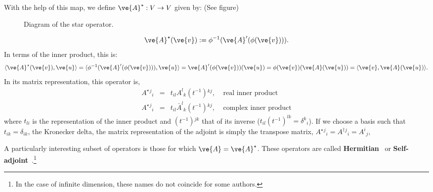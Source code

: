 {%
%
With the help of this map, we define $\ve{A}^{\star}: V \to V$ given by:
(See figure)




\espa 


\begin{figure}[htbp]
  \begin{center}
    \caption{Diagram of the star operator.}
    \label{fig:2_3}
  \end{center}
\end{figure}

\begin{equation}
  \label{eq:A_adjunto}
  \ve{A}^{\star}(\ve{v}) := \phi^{-1}(\ve{A}'(\phi(\ve{v}))).
\end{equation}
%
In terms of the inner product, this is:
\begin{equation}
  \label{eq:A_adjunto_2}
  \langle \ve{A}^{\star}(\ve{v}),\ve{u} \rangle = \langle \phi^{-1}(\ve{A}'(\phi(\ve{v}))),\ve{u} \rangle
                                               = \ve{A}'(\phi(\ve{v}))(\ve{u}) 
                                               = \phi(\ve{v})(\ve{A}(\ve{u}))
                                               = \langle \ve{v},\ve{A}(\ve{u}) \rangle.
\end{equation}
%
In its matrix representation, this operator is, 
\begin{eqnarray}
A^{\star}{}^j{}_i &=& t_{il} A^l{}_k (t^{-1}){}^{kj} , \;\;\;\; \mbox{real inner product} \\
A^{\star}{}^j{}_i &=& t_{il} \bar{A}^l{}_k (t^{-1}){}^{kj} , \;\;\;\; \mbox{complex inner product} 
\end{eqnarray}
%
where $t_{li}$ is the representation of the inner product and $(t^{-1}){}^{jk}$ that of its inverse 
($t_{il} (t^{-1})^{lk} = \delta^k{}_i$). 
If we choose a basis such that $t_{ik} = \delta_{ik}$, the Kronecker delta, the matrix representation of the adjoint is simply the transpose matrix, $A^{\star}{}^j{}_i = A^{\dagger}{}^j{}_i = A^i{}_j$, 

A particularly interesting subset of operators is those for which 
$\ve{A} = \ve{A}^{\star}$. These operators are called 
\textbf{Hermitian}~ or 
\textbf{Self-adjoint}~.\footnote{
In the case of infinite dimension, these names do not coincide for
some authors.}

}

